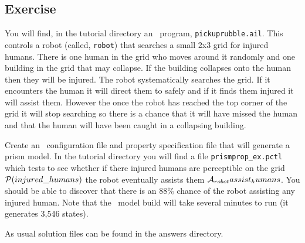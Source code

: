 \documentclass[a4]{article}
\begin{document}
\subsection{Exercise}

You will find, in the tutorial directory an \ail\ program, \texttt{pickuprubble.ail}.  This controls a robot (called, \texttt{robot}) that searches a small 2x3 grid for injured humans.  There is one human in the grid who moves around it randomly and one building in the grid that may collapse.  If the building collapses onto the human then they will be injured.  The robot systematically searches the grid.  If it encounters the human it will direct them to safely and if it finds them injured it will assist them.  However the once the robot has reached the top corner of the grid it will stop searching so there is a chance that it will have missed the human and that the human will have been caught in a collapsing building.

Create an \ajpf\ configuration file and property specification file that will generate a prism model.  In the tutorial directory you will find a file \texttt{prismprop\_ex.pctl} which tests to see whether if there injured humans are perceptible on the grid $\mathrm{{\cal P}}(injured\_humans)$ the robot eventually assists them $\mathrm{{\cal A}}_{robot} assist_humans$.  You should be able to discover that there is an 88\% chance of the robot assisting any injured human.  Note that the \ajpf\ model build will take several minutes to run (it generates 3,546 states).

As usual solution files can be found in the answers directory.

\end{document}
